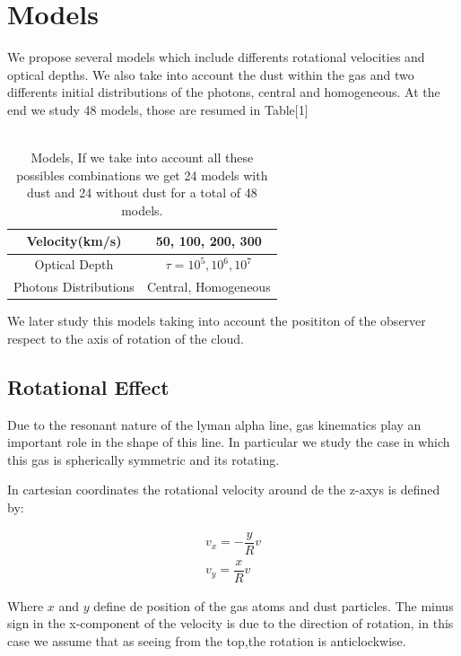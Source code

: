 \documentclass{article}
\theoremstyle{definition}
\theoremstyle{remark}
\begin{document}
\section*{Models}

We propose several models which include differents rotational
velocities and optical depths. We also take into account the dust
within the gas and two differents initial distributions of the
photons, central and homogeneous. At the end we study 48 models, those
are resumed in Table[1]\\ 
\\
\begin{table}[H]
\begin{center}
\begin{tabular}{|c|c|}
\hline
Velocity(km/s) & 50, 100, 200, 300\\
\hline
Optical Depth & $\tau = 10^{5},10^{6},10^{7}$\\
\hline
Photons Distributions & Central, Homogeneous\\
\hline
\end{tabular}
\caption{Models, If we take into account all these possibles
  combinations we get 24 models with dust and 24 without dust for a
  total of 48 models.} 
\end{center}
\end{table}

We later study this models taking into account the posititon of the
observer respect to the axis of rotation of the cloud. 

\subsection*{Rotational Effect}

Due to the resonant nature of the lyman alpha line, gas kinematics
play an important role in the shape of this line. In particular we
study the case in which this gas is spherically symmetric and its
rotating.

In cartesian coordinates the rotational velocity around de the z-axys
is defined by:

\begin{subequations}
\begin{align}
    v_{x}=-\dfrac{y}{R}v \label{subeq1}\\
    v_{y}=\dfrac{x}{R}v \label{subeq2}
\end{align}
\end{subequations}

Where $x$ and $y$ define de position of the gas atoms and dust
particles. The minus sign in the x-component of the velocity is due to
the direction of rotation, in this case we assume that as seeing from
the top,the rotation is anticlockwise.
\end{document}
